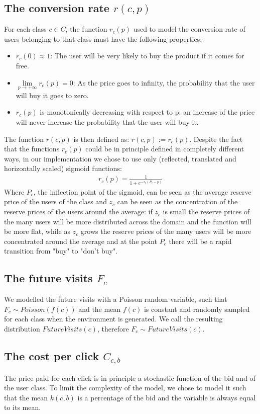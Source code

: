 \documentclass[11pt]{article} %
\begin{document}
\subsection{The conversion rate $r(c,p)$}
For each class $c \in C$, the function $r_c(p)$ used to model the conversion rate of users belonging to that class must have the following properties:
\begin{itemize}
\item $r_c(0) \approx 1$: The user will be very likely to buy the product if it comes for free.
\item $\lim\limits_{p \to +\infty} r_c(p) = 0$: As the price goes to infinity, the probability that the user will buy it goes to zero.
\item $r_c(p)$ is monotonically decreasing with respect to p: an increase of the price will never increase the probability that the user will buy it.
\end{itemize}
The function $r(c,p)$ is then defined as: $r(c,p) := r_c(p)$.
Despite the fact that the functions $r_c(p)$ could be in principle defined in completely different ways, in our implementation we chose to use only (reflected, translated and horizontally scaled) sigmoid functions:
\begin{align*}
r_c(p) = \frac{1}{1+e^{-z_c(P_c-p)}}
\end{align*}
Where $P_c$, the inflection point of the sigmoid, can be seen as the average reserve price of the users of the class and $z_c$ can be seen as the concentration of the reserve prices of the users around the average: if $z_c$ is small the reserve prices of the many users will be more distributed across the domain and the function will be more flat, while as $z_c$ grows the reserve prices of the many users will be more concentrated around the average and at the point $P_c$ there will be a rapid transition from "buy" to "don't buy".

\subsection{The future visits $F_c$}
We modelled the future visits with a Poisson random variable, such that $F_c \sim Poisson(f(c))$ and the mean $f(c)$ is constant and randomly sampled for each class when the environment is generated. We call the resulting distribution $FutureVisits(c)$, therefore $F_c \sim FutureVisits(c)$.

\subsection{The cost per click $C_{c,b}$}
The price paid for each click is in principle a stochastic function of the bid and of the user class. To limit the complexity of the model, we chose to model it such that the mean $k(c,b)$ is a percentage of the bid and the variable is always equal to its mean.
\end{document}
